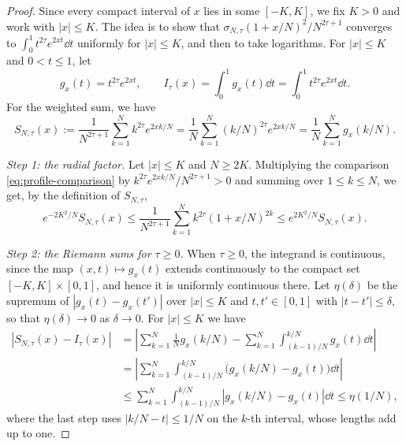 \begin{proof}
Since every compact interval of $x$ lies in some $[-K,K]$, we fix $K>0$
and work with $|x|\leq K$. The idea is to show that
$\sigma_{N,\tau}(1+x/N)^2/N^{2\tau+1}$ converges to
$\int_0^1t^{2\tau}e^{2xt}\dd t$ uniformly for $|x|\leq K$, and then to
take logarithms. For $|x|\leq K$ and $0<t\leq1$, let
\[
 g_x(t)=t^{2\tau}e^{2xt},\qquad
 I_\tau(x)=\int_0^1g_x(t)\dd t=\int_0^1t^{2\tau}e^{2xt}\dd t.
\]
For the weighted sum, we have
\[
 S_{N,\tau}(x):=\frac1{N^{2\tau+1}}\sum_{k=1}^N k^{2\tau}e^{2xk/N}
 =\frac1N\sum_{k=1}^N(k/N)^{2\tau}e^{2xk/N}
 =\frac1N\sum_{k=1}^Ng_x(k/N).
\]

\emph{Step 1: the radial factor.}
Let $|x|\leq K$ and $N\geq2K$. Multiplying the comparison
\eqref{eq:profile-comparison} by $k^{2\tau}e^{2xk/N}/N^{2\tau+1}>0$ and
summing over $1\leq k\leq N$, we get, by the definition of $S_{N,\tau}$,
\[
 e^{-2K^2/N}S_{N,\tau}(x)
 \leq\frac1{N^{2\tau+1}}\sum_{k=1}^N k^{2\tau}(1+x/N)^{2k}
 \leq e^{2K^2/N}S_{N,\tau}(x).
\]

\emph{Step 2: the Riemann sums for $\tau\geq0$.}
When $\tau\geq0$, the integrand is continuous, since the map
$(x,t)\mapsto g_x(t)$ extends continuously to the compact set
$[-K,K]\times[0,1]$, and hence it is uniformly continuous there.
Let $\eta(\delta)$ be the supremum of $|g_x(t)-g_x(t')|$ over
$|x|\leq K$ and $t,t'\in[0,1]$ with $|t-t'|\leq\delta$, so that
$\eta(\delta)\to0$ as $\delta\to0$. For $|x|\leq K$ we have
\begin{align*}
 |S_{N,\tau}(x)-I_\tau(x)|
 &=\left|\sum_{k=1}^N\frac1Ng_x(k/N)
    -\sum_{k=1}^N\int_{(k-1)/N}^{k/N}g_x(t)\dd t\right|\\
 &=\left|\sum_{k=1}^N\int_{(k-1)/N}^{k/N}
    \bigl(g_x(k/N)-g_x(t)\bigr)\dd t\right|\\
 &\leq\sum_{k=1}^N\int_{(k-1)/N}^{k/N}|g_x(k/N)-g_x(t)|\dd t
 \leq\eta(1/N),
\end{align*}
where the last step uses $|k/N-t|\leq1/N$ on the $k$-th interval, whose
lengths add up to one.


\end{proof}
